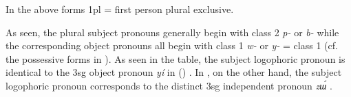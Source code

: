 \documentclass[output=paper]{langsci/langscibook}
\begin{document}
\begin{table}
\caption{Class {1/2} subject \& object pronouns in some EGB languages}
\label{extab:grassfields:4}
In the above forms 1pl = first person plural exclusive.
\end{table} 
As seen, the plural subject pronouns generally begin with class 2 \textit{p-} or \textit{b-} while the corresponding object pronouns all begin with class 1 \textit{w-} or \textit{y-} = class 1 (cf. the possessive forms in ). As seen in the table, the subject logophoric pronoun is identical to the 3sg object pronoun \textit{yí} in  () \citep[22]{HarroHaynes1991}. In , on the other hand, the subject logophoric pronoun corresponds to the distinct 3sg independent pronoun \textit{zɯ́} \citep[209]{Leroy2007}.
\end{document}
